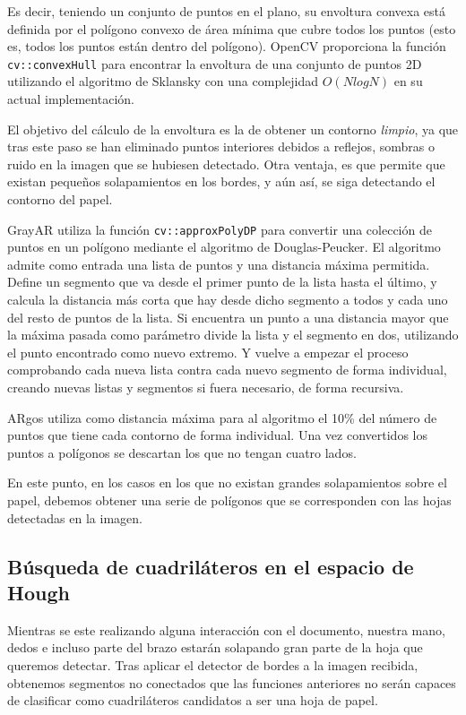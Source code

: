 Es decir, teniendo un conjunto de puntos en el plano, su envoltura convexa está definida por el
polígono convexo de área mínima que cubre todos los puntos (esto es, todos los puntos están dentro
del polígono). OpenCV proporciona la función \texttt{cv::convexHull} para encontrar la envoltura de
una conjunto de puntos 2D utilizando el algoritmo de Sklansky con una complejidad $O(N log N)$ en su
actual implementación.

El objetivo del cálculo de la envoltura es la de obtener un contorno \emph{limpio}, ya que tras este
paso se han eliminado puntos interiores debidos a reflejos, sombras o ruido en la imagen que se hubiesen
detectado. Otra ventaja, es que permite que existan pequeños solapamientos en los bordes, y aún así, se
siga detectando el contorno del papel.

GrayAR utiliza la función \texttt{cv::approxPolyDP}  para convertir una colección de puntos en un
polígono mediante el algoritmo de Douglas-Peucker. El algoritmo admite como entrada una lista de
puntos y una distancia máxima permitida. Define un segmento que va desde el primer punto de la lista
hasta el último, y calcula la distancia más corta que hay desde dicho segmento a todos y cada uno
del resto de puntos de la lista. Si encuentra un punto a una distancia mayor que la máxima pasada
como parámetro divide la lista y el segmento en dos, utilizando el punto encontrado como nuevo
extremo. Y vuelve a empezar el proceso comprobando cada nueva lista contra cada nuevo segmento de
forma individual, creando nuevas listas y segmentos si fuera necesario, de forma recursiva.

ARgos utiliza como distancia máxima para al algoritmo el 10\% del número de puntos que tiene cada
contorno de forma individual. Una vez convertidos los puntos a polígonos se descartan los que no
tengan cuatro lados.

En este punto, en los casos en los que no existan grandes solapamientos sobre el papel, debemos
obtener una serie de polígonos que se corresponden con las hojas detectadas en la imagen.



\subsection{Búsqueda de cuadriláteros en el espacio de Hough}
Mientras se este realizando alguna interacción con el documento, nuestra mano, dedos e incluso parte
del brazo estarán solapando gran parte de la hoja que queremos detectar. Tras aplicar el detector de
bordes a la imagen recibida, obtenemos segmentos no conectados que las funciones anteriores no serán
capaces de clasificar como cuadriláteros candidatos a ser una hoja de papel.

